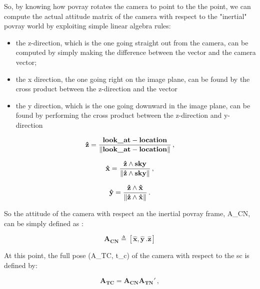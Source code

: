So, by knowing how \acrshort{povray} rotates the camera to point to the the  point, we can compute the actual attitude matrix of the camera with respect to the "inertial" \acrshort{povray} world by exploiting simple linear algebra rules:

\begin{itemize}
  \item the z-direction, which is the one going straight out from the camera, can be computed by simply making the difference between the  vector and the camera  vector;
  \item the x direction, the one going right on the image plane, can be found by the cross product between the z-direction and the  vector
  \item the y direction, which is the one going downward in the image plane, can be found by performing the cross product between the z-direction and y-direction
\end{itemize}

\begin{equation}
  \mathbf{\hat{z}} = \frac{\text{\inlinecode{POV}{look_at}} - \text{\inlinecode{POV}{location}}}{\norm{\text{\inlinecode{POV}{look_at}} - \text{\inlinecode{POV}{location}}}} \,,
\end{equation}

\begin{equation}
  \mathbf{\hat{x}} = \frac{\mathbf{\hat{z}} \wedge \text{\inlinecode{POV}{sky}}}{\norm{\mathbf{\hat{z}} \wedge \text{\inlinecode{POV}{sky}}}} \,,
\end{equation}

\begin{equation}
  \mathbf{\hat{y}} = \frac{\mathbf{\hat{z}} \wedge \mathbf{\hat{x}}}{\left\lVert\mathbf{\hat{z}} \wedge \mathbf{\hat{x}}\right\rVert} \,.
\end{equation}

So the attitude of the camera with respect an the inertial \acrshort{povray} frame, \gls{A_CN}, can be simply defined as :

\begin{equation}
  \mathbf{{A_{CN}}} \triangleq [\mathbf{\hat{x}}, \mathbf{\hat{y}} \,. \mathbf{\hat{z}}]
\end{equation}

At this point, the full pose (\gls{A_TC}, \gls{t_c}) of the camera with respect to the \acrshort{sc} is defined by:

\begin{equation}
  \mathbf{{A_{TC}}} = \mathbf{{A_{CN}}} \mathbf{{A_{TN}}'} \,,
\end{equation}

